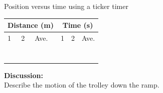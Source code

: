 \begin{f_experiment}{Position versus time using a ticker timer}
        \par 
          \begin{table}[H]
        \begin{center}
      \label{m38795*id7141349}
      \begin{tabular}{|l|l|l|l|l|l|}\hline
    \multicolumn{3}{|c|}{Distance (m)}
     &
    \multicolumn{3}{c|}{Time (s)}
     \\ \hline
        1 &
        2 &
        Ave. &
        1 &
        2 &
        Ave. \\ \hline
         &
         &
         &
         &
         &
      \\ \hline
         &
         &
         &
         &
         &
       \\ \hline
         &
         &
         &
         &
         &
       \\ \hline
         &
         &
         &
         &
         &
        \\ \hline
         &
         &
         &
         &
         &
        \\ \hline
         &
         &
         &
         &
         &
       \\ \hline
         &
         &
         &
         &
         &
      \\ \hline
    \end{tabular}
      \end{center}
\end{table}
    \par
        \label{m38795*id7172254}\noindent{}\textbf{Discussion:}\\
Describe the motion of the trolley down the ramp. 
\end{f_experiment}
\par \label{m38795*cid9}
